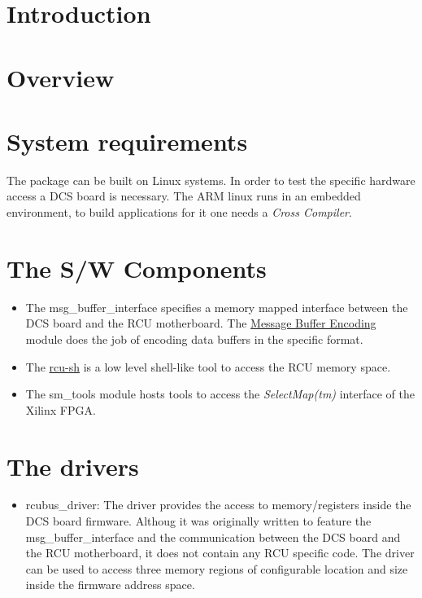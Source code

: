 \hypertarget{main_intro}{}\section{Introduction}\label{main_intro}
\hypertarget{main_overview}{}\section{Overview}\label{main_overview}
\begin{center}\end{center} \hypertarget{main_sysregs}{}\section{System requirements}\label{main_sysregs}
The package can be built on Linux systems. In order to test the specific hardware access a DCS board is necessary. The ARM linux runs in an embedded environment, to build applications for it one needs a {\em Cross Compiler\/}.\hypertarget{main_sw_components}{}\section{The S/W Components}\label{main_sw_components}
\begin{itemize}
\item The msg\_\-buffer\_\-interface specifies a memory mapped interface between the DCS board and the RCU motherboard. The \hyperlink{group__dcsc__msg__buffer__access}{Message Buffer Encoding} module does the job of encoding data buffers in the specific format.\item The \hyperlink{group__rcu__sh}{rcu-sh} is a low level shell-like tool to access the RCU memory space.\item The sm\_\-tools module hosts tools to access the {\em Select\-Map(tm)\/} interface of the Xilinx FPGA.\end{itemize}
\hypertarget{main_drivers}{}\section{The drivers}\label{main_drivers}
\begin{itemize}
\item rcubus\_\-driver: The driver provides the access to memory/registers inside the DCS board firmware. Althoug it was originally written to feature the msg\_\-buffer\_\-interface and the communication between the DCS board and the RCU motherboard, it does not contain any RCU specific code. The driver can be used to access three memory regions of configurable location and size inside the firmware address space.\end{itemize}
